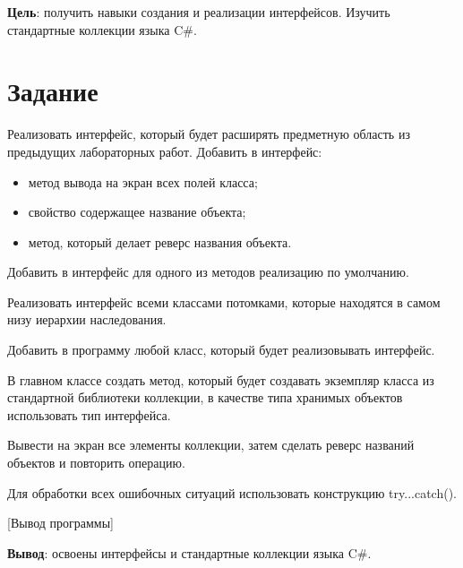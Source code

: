 \documentclass{bsuir}
\newcommand{\csharp}{C{\liberationrm\#}}
\begin{document}
\maketitle
\mainmatter
\renewcommand{\thefigure}{\arabic{figure}}
\renewcommand{\thelisting}{\arabic{listing}}

\textbf{Цель}: получить навыки создания и реализации интерфейсов. Изучить
стандартные коллекции языка \csharp.

\section*{Задание}

Реализовать интерфейс, который будет расширять предметную область из предыдущих
лабораторных работ. Добавить в интерфейс:

\begin{itemize}
    \item метод вывода на экран всех полей класса;
    \item свойство содержащее название объекта;
    \item метод, который делает реверс названия объекта.
\end{itemize}

Добавить в интерфейс для одного из методов реализацию по умолчанию.

Реализовать интерфейс всеми классами потомками, которые находятся в самом низу
иерархии наследования.

Добавить в программу любой класс, который будет реализовывать интерфейс.

В главном классе создать метод, который будет создавать экземпляр класса из
стандартной библиотеки коллекции, в качестве типа хранимых объектов использовать
тип интерфейса.

Вывести на экран все элементы коллекции, затем сделать реверс названий объектов
и повторить операцию.

Для обработки всех ошибочных ситуаций использовать конструкцию try...catch().


[Вывод программы]

\textbf{Вывод}: освоены интерфейсы и стандартные коллекции языка \csharp.
\end{document}
